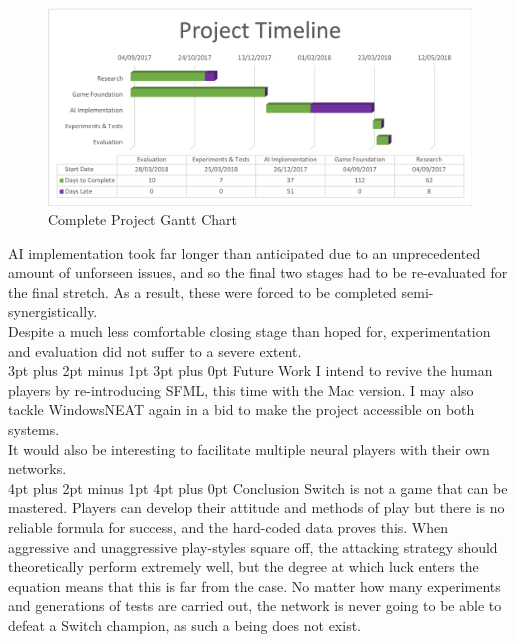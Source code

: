 \documentclass[12pt,a4paper]{article}
\makeatletter
\renewcommand\subsection{\@startsection {subsection}{1}{2mm} %
                               {3pt plus 2pt minus 1pt} %
                               {3pt plus 0pt} %
                               {\normalfont\bfseries}}
\renewcommand\section{\@startsection {section}{1}{0mm} %
                               {4pt plus 2pt minus 1pt} %
                               {4pt plus 0pt} %
                               {\bfseries}}
\makeatother
\begin{document}

\begin{figure}[h]
	\centering
	\includegraphics[width = \textwidth]{Gantt4.png}
	\caption{Complete Project Gantt Chart}
\end{figure}

AI implementation took far longer than anticipated due to an unprecedented amount of unforseen issues, and so the final two stages had to be re-evaluated for the final stretch. As a result, these were forced to be completed semi-synergistically.\\

Despite a much less comfortable closing stage than hoped for, experimentation and evaluation did not suffer to a severe extent.\\

\subsection{Future Work}
I intend to revive the human players by re-introducing SFML, this time with the Mac version. I may also tackle WindowsNEAT again in a bid to make the project accessible on both systems.\\

It would also be interesting to facilitate multiple neural players with their own networks.\\

\newpage
\section{Conclusion}
Switch is not a game that can be mastered. Players can develop their attitude and methods of play but there is no reliable formula for success, and the hard-coded data proves this. When aggressive and unaggressive play-styles square off, the attacking strategy should theoretically perform extremely well, but the degree at which luck enters the equation means that this is far from the case. No matter how many experiments and generations of tests are carried out, the network is never going to be able to defeat a Switch champion, as such a being does not exist. 
\end{document}
